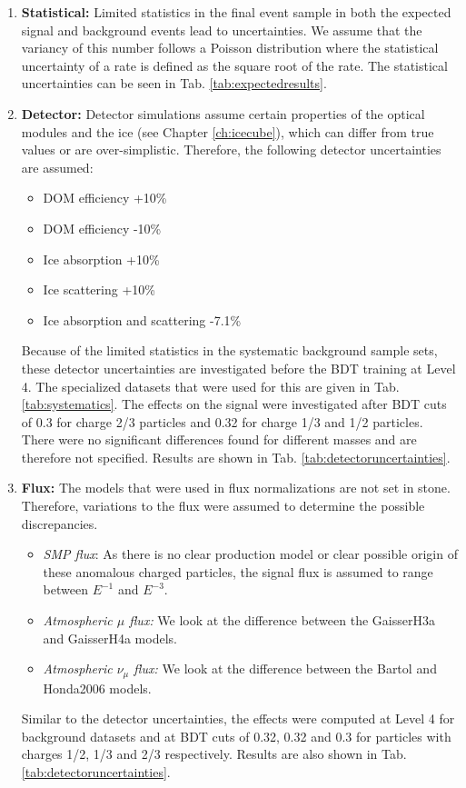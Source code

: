 \begin{enumerate}
\item \textbf{Statistical:} Limited statistics in the final event sample in both the expected signal and background events lead to uncertainties. We assume that the variancy of this number follows a Poisson distribution where the statistical uncertainty of a rate is defined as the square root of the rate. The statistical uncertainties can be seen in Tab. \ref{tab:expectedresults}.
\item \textbf{Detector: } Detector simulations assume certain properties of the optical modules and the ice (see Chapter \ref{ch:icecube}), which can differ from true values or are over-simplistic. Therefore, the following detector uncertainties are assumed:
\vspace{2mm}
\begin{itemize}
\item DOM efficiency +10\%
\item DOM efficiency -10\%
\item Ice absorption +10\%
\item Ice scattering +10\%
\item Ice absorption and scattering -7.1\%
\end{itemize}
\vspace{2mm}
Because of the limited statistics in the systematic background sample sets, these detector uncertainties are investigated before the BDT training at Level 4. The specialized datasets that were used for this are given in Tab. \ref{tab:systematics}. The effects on the signal were investigated after BDT cuts of 0.3 for charge 2/3 particles and 0.32 for charge 1/3 and 1/2 particles. There were no significant differences found for different masses and are therefore not specified. Results are shown in Tab. \ref{tab:detectoruncertainties}.
\item \textbf{Flux: }The models that were used in flux normalizations are not set in stone. Therefore, variations to the flux were assumed to determine the possible discrepancies.
\begin{itemize}
\item \textit{SMP flux}: As there is no clear production model or clear possible origin of these anomalous charged particles, the signal flux is assumed to range between $E^{-1}$ and $E^{-3}$. 
\item \textit{Atmospheric $\mu$ flux: }We look at the difference between the GaisserH3a \cite{Gaisser:2013bla} and GaisserH4a \cite{Gaisser:2011cc} models.
\item \textit{Atmospheric $\nu_\mu$ flux: }We look at the difference between the Bartol \cite{PhysRevD.70.023006} and Honda2006 \cite{Honda:2006qj} models.
\end{itemize}
Similar to the detector uncertainties, the effects were computed at Level 4 for background datasets and at BDT cuts of 0.32, 0.32 and 0.3 for particles with charges 1/2, 1/3 and 2/3 respectively. Results are also shown in Tab. \ref{tab:detectoruncertainties}.


\end{enumerate}
